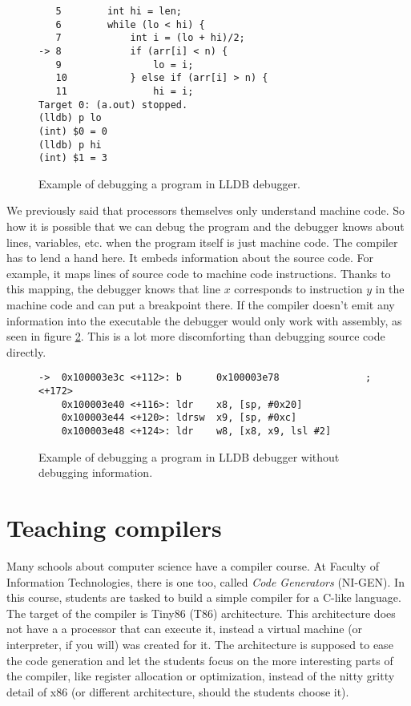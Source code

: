 \begin{figure}\label{fig:lldb-debug1}
\begin{verbatim}
   5   	    int hi = len;
   6   	    while (lo < hi) {
   7   	        int i = (lo + hi)/2;
-> 8   	        if (arr[i] < n) {
   9   	            lo = i;
   10  	        } else if (arr[i] > n) {
   11  	            hi = i;
Target 0: (a.out) stopped.
(lldb) p lo
(int) $0 = 0
(lldb) p hi
(int) $1 = 3
\end{verbatim}
\caption{Example of debugging a program in LLDB debugger.}
\end{figure}

We previously said that processors themselves only understand machine code. So
how it is possible that we can debug the program and the debugger knows about
lines, variables, etc. when the program itself is just machine code. The
compiler has to lend a hand here. It embeds information about the source code.
For example, it maps lines of source code to machine code instructions. Thanks
to this mapping, the debugger knows that line $x$ corresponds to instruction
$y$ in the machine code and can put a breakpoint there. If the compiler doesn't
emit any information into the executable the debugger would only work with
assembly, as seen in figure \ref{fig:lldb-debug2}. This is a lot more
discomforting than debugging source code directly.

\begin{figure}\label{fig:lldb-debug2}
\begin{lstlisting}
->  0x100003e3c <+112>: b      0x100003e78               ; <+172>
    0x100003e40 <+116>: ldr    x8, [sp, #0x20]
    0x100003e44 <+120>: ldrsw  x9, [sp, #0xc]
    0x100003e48 <+124>: ldr    w8, [x8, x9, lsl #2]
\end{lstlisting}
\caption{Example of debugging a program in LLDB debugger without debugging information.}
\end{figure}

\section{Teaching compilers}
Many schools about computer science have a compiler course. At Faculty of
Information Technologies, there is one too, called \textit{Code Generators}
(NI-GEN). In this course, students are tasked to build a simple compiler for a
C-like language. The target of the compiler is Tiny86 (T86) architecture. This
architecture  does not have a a
processor that can execute it, instead a virtual machine (or interpreter, if
you will) was created for it. The architecture is supposed to ease the code
generation and let the students focus on the more interesting parts of the
compiler, like register allocation or optimization, instead of the nitty gritty
detail of x86 (or different architecture, should the students choose it).

